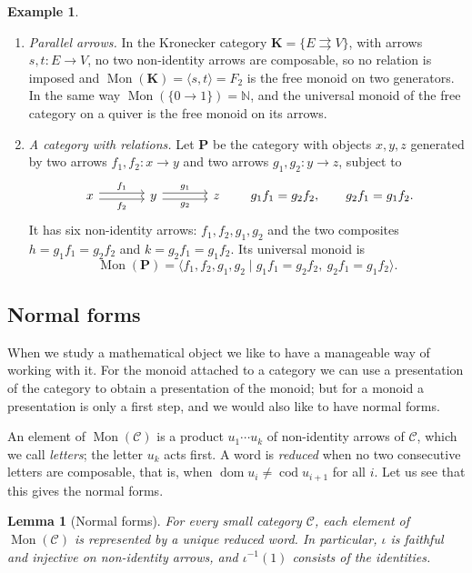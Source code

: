 \documentclass[11pt]{amsart}
\newtheorem{lemma}[teo]{Lemma}
\theoremstyle{definition}
\newtheorem{example}[teo]{Example}
\theoremstyle{remark}
\numberwithin{figure}{section}%
\newcommand{\CC}{\mathcal{C}}
\DeclareMathOperator{\Mon}{Mon}
\DeclareMathOperator{\dom}{dom}
\DeclareMathOperator{\cod}{cod}
\newcommand{\C}{\mathcal{C}}
\begin{document}
\begin{example}
\label{ex:universal-monoids}
\begin{enumerate}[leftmargin=*]
\item \emph{Parallel arrows.} In the Kronecker category $\mathbf K=\{E\rightrightarrows V\}$, with arrows $s,t\colon E\to V$, no two non-identity arrows are composable, so no relation is imposed and $\Mon(\mathbf K)=\langle s, t \rangle=F_2$ is the free monoid on two generators. In the same way $\Mon(\{0\to1\})=\mathbb N$, and the universal monoid of the free category on a quiver is the free monoid on its arrows.
\item \emph{A category with relations.} Let $\mathbf P$ be the category with objects $x,y,z$ generated by two arrows $f_1,f_2\colon x\to y$ and two arrows $g_1,g_2\colon y\to z$, subject to
\[
\begin{tikzcd}[column sep=large]
x \arrow[r, shift left, "f_1"] \arrow[r, shift right, "f_2"'] & y \arrow[r, shift left, "g_1"] \arrow[r, shift right, "g_2"'] & z
\end{tikzcd}
\qquad g_1f_1=g_2f_2,\qquad g_2f_1=g_1f_2 .
\]
It has six non-identity arrows: $f_1,f_2,g_1,g_2$ and the two composites $h=g_1f_1=g_2f_2$ and $k=g_2f_1=g_1f_2$. Its universal monoid is
\[
\Mon(\mathbf P)=\langle f_1,f_2,g_1,g_2\mid g_1f_1=g_2f_2,\ g_2f_1=g_1f_2\rangle .
\]
\end{enumerate}
\end{example}

\subsection{Normal forms}

When we study a mathematical object we like to have a manageable way of working with it. For the monoid attached to a category we can use a presentation of the category to obtain a presentation of the monoid; but for a monoid a presentation is only a first step, and we would also like to have normal forms.

An element of $\Mon(\CC)$ is a product $u_1\cdots u_k$ of non-identity arrows of $\CC$, which we call \emph{letters}; the letter $u_k$ acts first. A word is \emph{reduced} when no two consecutive letters are composable, that is, when $\dom u_i\neq\cod u_{i+1}$ for all $i$. Let us see that this gives the normal forms.

\begin{lemma}[Normal forms]\label{lem:nf}
For every small category $\C$, each element of $\Mon(\C)$ is represented by a unique reduced word. In particular, $\iota$ is faithful and injective on non-identity arrows, and $\iota^{-1}(1)$ consists of the identities.
\end{lemma}
\end{document}
